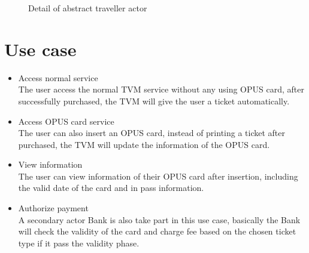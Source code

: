 \documentclass[12pt]{report}
\begin{document}
\begin{figure}[htb]
  \centering
  \caption{Detail of abstract traveller actor}
\end{figure}

\section{Use case}
\begin{itemize}
	\item Access normal service\\
	The user access the normal TVM service without any using OPUS card, after successfully purchased, the TVM will give the user a ticket automatically.
	\item Access OPUS card service\\
	The user can also insert an OPUS card, instead of printing a ticket after purchased, the TVM will update the information of the OPUS card.
	\item View information\\
	The user can view information of their OPUS card after insertion, including the valid date of the card and in pass information.
	\item Authorize payment\\
	A secondary actor Bank is also take part in this use case, basically the Bank will check the validity of the card and charge fee based on the chosen ticket type if it pass the validity phase.
\end{itemize}
\end{document}
